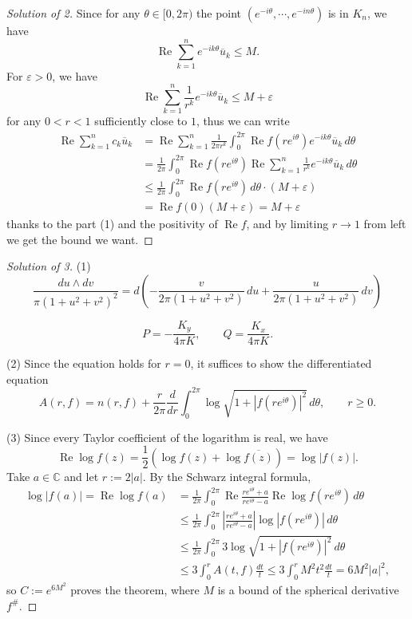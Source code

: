 \documentclass[a4paper]{article}
\theoremstyle{definition}
\renewcommand{\Re}{\operatorname{Re}}
\newcommand{\C}{\mathbb{C}}
\newcommand{\e}{\varepsilon}
\renewcommand{\bar}{\overline}
\begin{document}
\begin{proof}[Solution of 2]
Since for any $\theta\in[0,2\pi)$ the point $(e^{-i\theta},\cdots,e^{-in\theta})$ is in $K_n$, we have
\[\Re\sum_{k=1}^ne^{-ik\theta}\bar u_k\le M.\]
For $\e>0$, we have
\[\Re\sum_{k=1}^n\frac1{r^k}e^{-ik\theta}\bar u_k\le M+\e\]
for any $0<r<1$ sufficiently close to $1$, thus we can write
\begin{align*}
\Re\sum_{k=1}^nc_k\bar u_k
&=\Re\sum_{k=1}^n\frac1{2\pi r^k}\int_0^{2\pi}\Re f(re^{i\theta})e^{-ik\theta}\bar u_k\,d\theta\\
&=\frac1{2\pi}\int_0^{2\pi}\Re f(re^{i\theta})\Re\sum_{k=1}^n\frac1{r^k}e^{-ik\theta}\bar u_k\,d\theta\\
&\le\frac1{2\pi}\int_0^{2\pi}\Re f(re^{i\theta})\,d\theta\cdot(M+\e)\\
&=\Re f(0)(M+\e)=M+\e
\end{align*}
thanks to the part (1) and the positivity of $\Re f$, and by limiting $r\to1$ from left we get the bound we want.
\end{proof}


\newpage
\begin{proof}[Solution of 3]
(1)
\[\frac{du\wedge dv}{\pi(1+u^2+v^2)^2}=d\left(-\frac v{2\pi(1+u^2+v^2)}\,du+\frac u{2\pi(1+u^2+v^2)}\,dv\right)\]


\[P=-\frac{K_y}{4\pi K},\qquad Q=\frac{K_x}{4\pi K}.\]

(2)
Since the equation holds for $r=0$, it suffices to show the differentiated equation
\[A(r,f)=n(r,f)+\frac r{2\pi}\frac d{dr}\int_0^{2\pi}\log\sqrt{1+|f(re^{i\theta})|^2}\,d\theta,\qquad r\ge0.\]

(3)
Since every Taylor coefficient of the logarithm is real, we have
\[\Re\log f(z)=\frac12(\log f(z)+\log\bar{f(z)})=\log|f(z)|.\]
Take $a\in\C$ and let $r:=2|a|$.
By the Schwarz integral formula,
\begin{align*}
\log|f(a)|=\Re\log f(a)&=\frac1{2\pi}\int_0^{2\pi}\Re\frac{re^{i\theta}+a}{re^{i\theta}-a}\Re\log f(re^{i\theta})\,d\theta\\
&\le\frac1{2\pi}\int_0^{2\pi}\left|\frac{re^{i\theta}+a}{re^{i\theta}-a}\right|\log|f(re^{i\theta})|\,d\theta\\
&\le\frac1{2\pi}\int_0^{2\pi}3\log\sqrt{1+|f(re^{i\theta})|^2}\,d\theta\\
&\le3\int_0^rA(t,f)\frac{dt}t\le3\int_0^rM^2t^2\frac{dt}t=6M^2|a|^2,
\end{align*}
so $C:=e^{6M^2}$ proves the theorem, where $M$ is a bound of the spherical derivative $f^\#$.
\end{proof}
\end{document}
